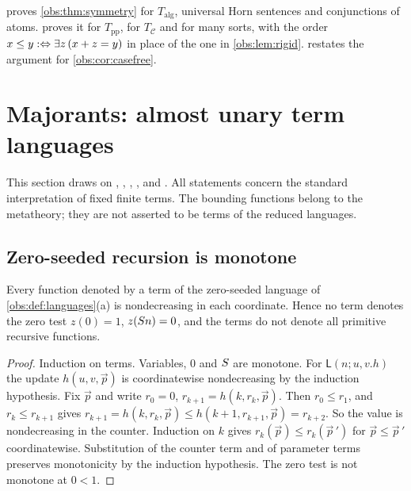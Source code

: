 \begin{remark}
 proves \cref{obs:thm:symmetry} for $T_{\mathrm{alg}}$, universal
Horn sentences and conjunctions of atoms.  proves it for
$T_{\mathrm{pp}}$, for $T_{\mathcal{C}}$ and for many sorts, with the order
$x\le y\mathrel{:\Leftrightarrow}\exists z\,(x+z=y)$ in place of the one in \cref{obs:lem:rigid}.
 restates the argument for
\cref{obs:cor:casefree}.
\end{remark}

\section{Majorants: almost unary term languages}
\label{obs:sec:majorants}

This section draws on , ,
, ,  and
. All
statements concern the standard interpretation of fixed finite terms. The
bounding functions belong to the metatheory; they are not asserted to be terms
of the reduced languages.

\subsection{Zero-seeded recursion is monotone}

\begin{proposition}
\label{obs:prop:monotone}
Every function denoted by a term of the zero-seeded language of
\cref{obs:def:languages}(a) is nondecreasing in each coordinate. Hence no term
denotes the zero test $z(0)=1$, $z(S n)=0$, and the terms do not denote all
primitive recursive functions.
\end{proposition}

\begin{proof}
Induction on terms. Variables, $0$ and $S$ are monotone. For
$\mathsf{L}(n;u,v.h)$ the update $h(u,v,\vec p)$ is coordinatewise
nondecreasing by the induction hypothesis. Fix $\vec p$ and write $r_0=0$,
$r_{k+1}=h(k,r_k,\vec p)$. Then $r_0\le r_1$, and $r_k\le r_{k+1}$ gives
$r_{k+1}=h(k,r_k,\vec p)\le h(k+1,r_{k+1},\vec p)=r_{k+2}$. So the value is
nondecreasing in the counter. Induction on $k$ gives
$r_k(\vec p)\le r_k(\vec p\,')$ for $\vec p\le\vec p\,'$ coordinatewise.
Substitution of the counter term and of parameter terms preserves monotonicity
by the induction hypothesis. The zero test is not monotone at $0<1$.
\end{proof}

